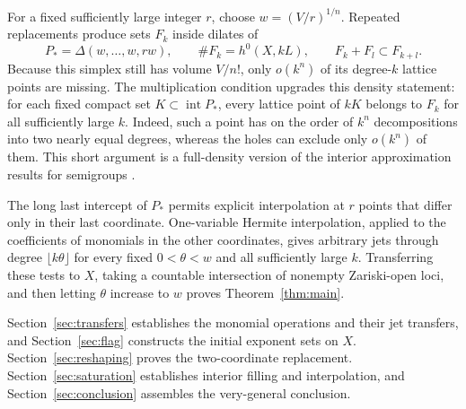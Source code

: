 For a fixed sufficiently large integer $r$, choose $w=(V/r)^{1/n}$.
Repeated replacements produce sets $F_k$ inside dilates of
\[
 P_* = \Delta(w,\ldots,w,rw),
 \qquad \#F_k=h^0(X,kL),
 \qquad F_k+F_l\subset F_{k+l}.
\]
Because this simplex still has volume $V/n!$, only $o(k^n)$ of its degree-$k$
lattice points are missing. The multiplication condition upgrades this
density statement: for each fixed compact set $K\subset\operatorname{int}P_*$,
every lattice point of $kK$ belongs to $F_k$ for all sufficiently large $k$.
Indeed, such a point has on the order of
$k^n$ decompositions into two nearly equal degrees, whereas the holes can
exclude only $o(k^n)$ of them. This short argument is a full-density version
of the interior approximation results for semigroups
\cite[Theorem~1.6]{KavehKhovanskii2012}.

The long last intercept of $P_*$ permits explicit interpolation at $r$
points that differ only in their last coordinate. One-variable Hermite
interpolation, applied to the coefficients of monomials in the other
coordinates, gives arbitrary jets through degree $\lfloor k\theta\rfloor$
for every fixed $0<\theta<w$ and all sufficiently large $k$.
Transferring these tests to $X$, taking a countable intersection of
nonempty Zariski-open loci, and then letting $\theta$ increase to $w$
proves Theorem~\ref{thm:main}.

Section~\ref{sec:transfers} establishes the monomial operations and their
jet transfers, and Section~\ref{sec:flag} constructs the initial exponent
sets on $X$. Section~\ref{sec:reshaping} proves the two-coordinate
replacement. Section~\ref{sec:saturation} establishes interior filling and
interpolation, and Section~\ref{sec:conclusion} assembles the very-general
conclusion.
